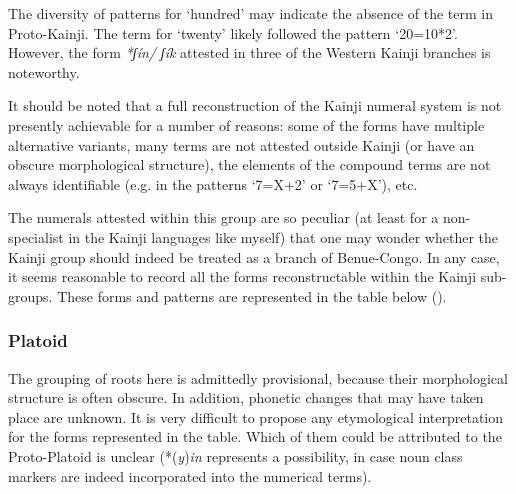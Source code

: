 The diversity of patterns for `hundred' may indicate the absence of the term in Proto-Kainji. The term for `twenty' likely followed the pattern ‘20=10*2’. However, the form \textit{*ʃín/} \textit{ʃík} attested in three of the Western Kainji branches is noteworthy. 

  
It should be noted that a full reconstruction of the Kainji numeral system is not presently achievable for a number of reasons: some of the forms have multiple alternative variants, many terms are not attested outside Kainji (or have an obscure morphological structure), the elements of the compound terms are not always identifiable (e.g. in the patterns ‘7={X}+2’ or ‘7=5+{X}’), etc.

The numerals attested within this group are so peculiar (at least for a non-specialist in the Kainji languages like myself) that one may wonder whether the Kainji group should indeed be treated as a branch of Benue-Congo. In any case, it seems reasonable to record all the forms reconstructable within the Kainji sub-groups. These forms and patterns are represented in the table below ().


\newpage  
\subsubsection{Platoid}\label{sec:3.1.2.8}


The grouping of roots here is admittedly provisional, because their morphological structure is often obscure. In addition, phonetic changes that may have taken place are unknown. It is very difficult to propose any etymological interpretation for the forms represented in the table. Which of them could be attributed to the Proto-Platoid is unclear (*(\textit{y})\textit{in} represents a possibility, in case noun class markers are indeed incorporated into the numerical terms).


